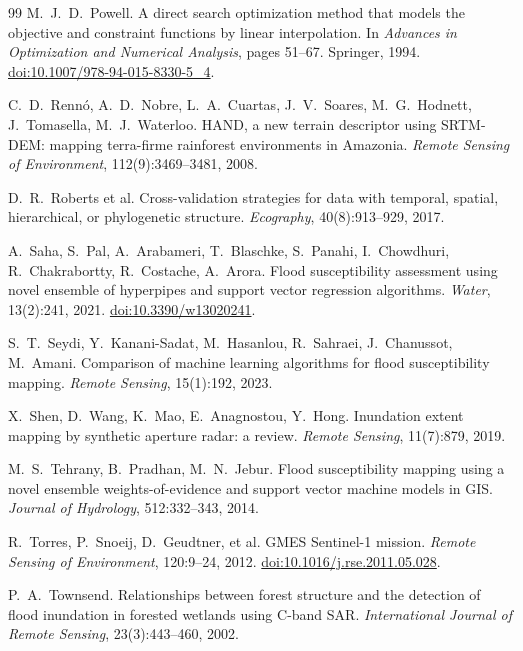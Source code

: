 \documentclass[11pt,a4paper]{article}
\begin{document}
\begin{thebibliography}{99}
M.~J.~D.~Powell.
A direct search optimization method that models the objective and constraint
functions by linear interpolation.
In \emph{Advances in Optimization and Numerical Analysis}, pages 51--67.
Springer, 1994.
\href{https://doi.org/10.1007/978-94-015-8330-5_4}{doi:10.1007/978-94-015-8330-5\_4}.

C.~D.~Renn\'o, A.~D.~Nobre, L.~A.~Cuartas, J.~V.~Soares, M.~G.~Hodnett,
J.~Tomasella, M.~J.~Waterloo.
HAND, a new terrain descriptor using SRTM-DEM: mapping terra-firme rainforest
environments in Amazonia.
\emph{Remote Sensing of Environment}, 112(9):3469--3481, 2008.

D.~R.~Roberts et al.
Cross-validation strategies for data with temporal, spatial, hierarchical, or
phylogenetic structure.
\emph{Ecography}, 40(8):913--929, 2017.

A.~Saha, S.~Pal, A.~Arabameri, T.~Blaschke, S.~Panahi, I.~Chowdhuri,
R.~Chakrabortty, R.~Costache, A.~Arora.
Flood susceptibility assessment using novel ensemble of hyperpipes and support
vector regression algorithms.
\emph{Water}, 13(2):241, 2021.
\href{https://doi.org/10.3390/w13020241}{doi:10.3390/w13020241}.

S.~T.~Seydi, Y.~Kanani-Sadat, M.~Hasanlou, R.~Sahraei, J.~Chanussot,
M.~Amani.
Comparison of machine learning algorithms for flood susceptibility mapping.
\emph{Remote Sensing}, 15(1):192, 2023.

X.~Shen, D.~Wang, K.~Mao, E.~Anagnostou, Y.~Hong.
Inundation extent mapping by synthetic aperture radar: a review.
\emph{Remote Sensing}, 11(7):879, 2019.

M.~S.~Tehrany, B.~Pradhan, M.~N.~Jebur.
Flood susceptibility mapping using a novel ensemble weights-of-evidence and
support vector machine models in GIS.
\emph{Journal of Hydrology}, 512:332--343, 2014.

R.~Torres, P.~Snoeij, D.~Geudtner, et al.
GMES Sentinel-1 mission.
\emph{Remote Sensing of Environment}, 120:9--24, 2012.
\href{https://doi.org/10.1016/j.rse.2011.05.028}{doi:10.1016/j.rse.2011.05.028}.

P.~A.~Townsend.
Relationships between forest structure and the detection of flood inundation in
forested wetlands using C-band SAR.
\emph{International Journal of Remote Sensing}, 23(3):443--460, 2002.


\end{thebibliography}
\end{document}
